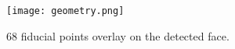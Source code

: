 \begin{figure}[H]
    \centering
	\texttt{[image: geometry.png]}
    \caption{68 fiducial points overlay on the detected face.}
    \label{image:geometry}
\end{figure}